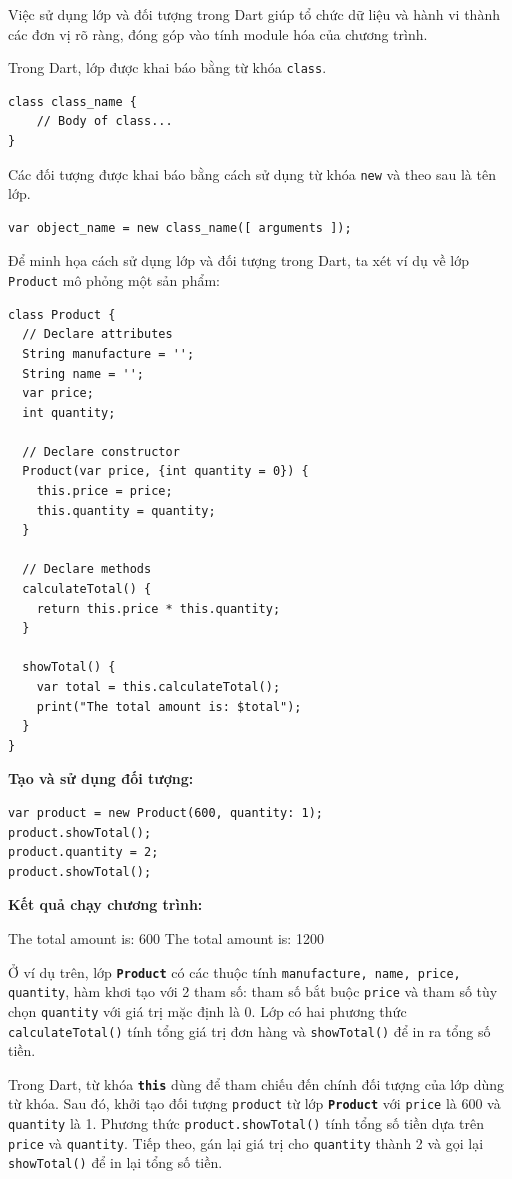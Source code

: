 \documentclass[../DoAn.tex]{subfiles}
\numberwithin{figure}{chapter}
\begin{document}
Việc sử dụng lớp và đối tượng trong Dart giúp tổ chức dữ liệu và hành vi thành các đơn vị rõ ràng, đóng góp vào tính module hóa của chương trình.

Trong Dart, lớp được khai báo bằng từ khóa \texttt{class}.
\begin{lstlisting}
class class_name {
    // Body of class...
}
\end{lstlisting}

Các đối tượng được khai báo bằng cách sử dụng từ khóa \texttt{new} và theo sau là tên lớp.
\begin{lstlisting}
var object_name = new class_name([ arguments ]);
\end{lstlisting}

Để minh họa cách sử dụng lớp và đối tượng trong Dart, ta xét ví dụ về lớp \texttt{Product} mô phỏng một sản phẩm:

\begin{lstlisting}
class Product {
  // Declare attributes
  String manufacture = '';
  String name = '';
  var price;
  int quantity;

  // Declare constructor
  Product(var price, {int quantity = 0}) {
    this.price = price;
    this.quantity = quantity;
  }

  // Declare methods
  calculateTotal() {
    return this.price * this.quantity;
  }

  showTotal() {
    var total = this.calculateTotal();
    print("The total amount is: $total");
  }
}
\end{lstlisting}

\textbf{Tạo và sử dụng đối tượng:}
\begin{lstlisting}
var product = new Product(600, quantity: 1);
product.showTotal();
product.quantity = 2;
product.showTotal();
\end{lstlisting}

\textbf{Kết quả chạy chương trình:}
\begin{myverbatim}
The total amount is: 600
The total amount is: 1200
\end{myverbatim}

Ở ví dụ trên, lớp \texttt{\textbf{Product}} có các thuộc tính \texttt{manufacture, name, price, quantity}, hàm khơi tạo với 2 tham số: tham số bắt buộc \texttt{price} và tham số tùy chọn \texttt{quantity} với giá trị mặc định là 0. Lớp có hai phương thức \\ \texttt{calculateTotal()} tính tổng giá trị đơn hàng và \texttt{showTotal()} để in ra tổng số tiền.

Trong Dart, từ khóa \textbf{\texttt{this}} dùng để tham chiếu đến chính đối tượng của lớp dùng từ khóa.
Sau đó, khởi tạo đối tượng \texttt{product} từ lớp \textbf{\texttt{Product}} với \texttt{price} là 600 và \texttt{quantity} là 1. Phương thức \texttt{product.showTotal()} tính tổng số tiền dựa trên \texttt{price} và \texttt{quantity}. Tiếp theo, gán lại giá trị cho \texttt{quantity} thành 2 và gọi lại \texttt{showTotal()} để in lại tổng số tiền. 
\end{document}
